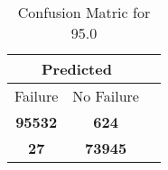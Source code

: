 \begin{table}[] 
\caption{Confusion Matric for 95.0} 
\label{Table: Prediction Accuracy-DMD95.0OnlySunEKF-combinationReflectionEKF-top2perfectNoFailurePrediction-Reflection} 
\centering 
\begin{tabular} 
 {@{}ccc@{}} 
\toprule 
\multicolumn{2}{c}{\textbf{Predicted}}
 \\ \midrule 
\multicolumn{1}{|c|}{Failure} & 
\multicolumn{1}{c|}{No Failure}
 \\ \midrule 
\multicolumn{1}{|c|}{\color{green}\textbf{95532}} & 
\multicolumn{1}{c|}{\color{red}\textbf{624}}
 \\ \midrule 
\multicolumn{1}{|c|}{\color{red}\textbf{27}} & 
\multicolumn{1}{c|}{\color{green}\textbf{73945}}
 \\ \bottomrule 
\end{tabular} 
\end{table} 

